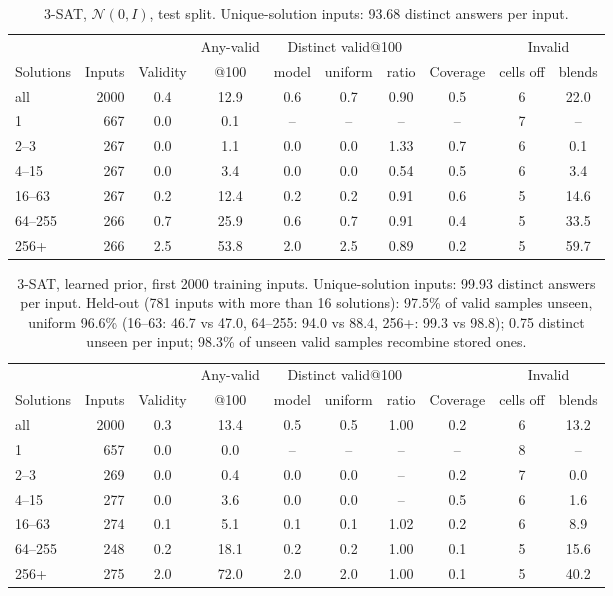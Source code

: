 \documentclass[11pt]{article}
\begin{document}
\begin{table}[H]
\centering\small
\begin{tabular}{@{}lrcccccccc@{}}
\toprule
& & & Any-valid & \multicolumn{3}{c}{Distinct valid@100} & & \multicolumn{2}{c}{Invalid} \\
\cmidrule(lr){5-7}\cmidrule(l){9-10}
Solutions & Inputs & Validity & @100 & model & uniform & ratio & Coverage & cells off & blends \\
\midrule
all & 2000 & 0.4 & 12.9 & 0.6 & 0.7 & 0.90 & 0.5 & 6 & 22.0 \\
1 & 667 & 0.0 & 0.1 & -- & -- & -- & -- & 7 & -- \\
2--3 & 267 & 0.0 & 1.1 & 0.0 & 0.0 & 1.33 & 0.7 & 6 & 0.1 \\
4--15 & 267 & 0.0 & 3.4 & 0.0 & 0.0 & 0.54 & 0.5 & 6 & 3.4 \\
16--63 & 267 & 0.2 & 12.4 & 0.2 & 0.2 & 0.91 & 0.6 & 5 & 14.6 \\
64--255 & 266 & 0.7 & 25.9 & 0.6 & 0.7 & 0.91 & 0.4 & 5 & 33.5 \\
256+ & 266 & 2.5 & 53.8 & 2.0 & 2.5 & 0.89 & 0.2 & 5 & 59.7 \\
\bottomrule
\end{tabular}
\caption{3-SAT, $\mathcal{N}(0,I)$, test split. Unique-solution inputs: 93.68 distinct answers per input.}
\end{table}

\begin{table}[H]
\centering\small
\begin{tabular}{@{}lrcccccccc@{}}
\toprule
& & & Any-valid & \multicolumn{3}{c}{Distinct valid@100} & & \multicolumn{2}{c}{Invalid} \\
\cmidrule(lr){5-7}\cmidrule(l){9-10}
Solutions & Inputs & Validity & @100 & model & uniform & ratio & Coverage & cells off & blends \\
\midrule
all & 2000 & 0.3 & 13.4 & 0.5 & 0.5 & 1.00 & 0.2 & 6 & 13.2 \\
1 & 657 & 0.0 & 0.0 & -- & -- & -- & -- & 8 & -- \\
2--3 & 269 & 0.0 & 0.4 & 0.0 & 0.0 & -- & 0.2 & 7 & 0.0 \\
4--15 & 277 & 0.0 & 3.6 & 0.0 & 0.0 & -- & 0.5 & 6 & 1.6 \\
16--63 & 274 & 0.1 & 5.1 & 0.1 & 0.1 & 1.02 & 0.2 & 6 & 8.9 \\
64--255 & 248 & 0.2 & 18.1 & 0.2 & 0.2 & 1.00 & 0.1 & 5 & 15.6 \\
256+ & 275 & 2.0 & 72.0 & 2.0 & 2.0 & 1.00 & 0.1 & 5 & 40.2 \\
\bottomrule
\end{tabular}
\caption{3-SAT, learned prior, first 2000 training inputs. Unique-solution inputs: 99.93 distinct answers per input. Held-out (781 inputs with more than 16 solutions): 97.5\% of valid samples unseen, uniform 96.6\% (16--63: 46.7 vs 47.0, 64--255: 94.0 vs 88.4, 256+: 99.3 vs 98.8); 0.75 distinct unseen per input; 98.3\% of unseen valid samples recombine stored ones.}
\end{table}
\end{document}
